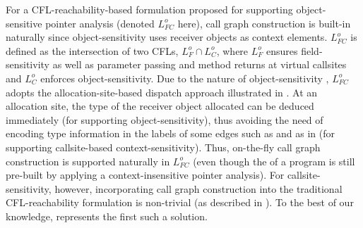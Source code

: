 For a CFL-reachability-based formulation \cite{lu2019precision, lu2021eagle}   proposed for
supporting object-sensitive pointer
analysis \cite{milanova2002parameterized,milanova2005parameterized} (denoted
$L_{FC}^o$ here),  call graph
construction is  built-in naturally since object-sensitivity uses receiver objects
as context elements. 
$L_{FC}^o$ is  defined as the intersection of two CFLs, 
$L_{F}^o \cap L_{C}^o$, where $L_{F}^o$ ensures field-sensitivity as well
as  parameter
passing and method returns at virtual callsites and $L_{C}^o$ enforces
object-sensitivity. Due to the nature of object-sensitivity
\cite{milanova2002parameterized,milanova2005parameterized},
$L_{FC}^{o}$ adopts the allocation-site-based dispatch approach illustrated in . At an allocation site, the type of the receiver object allocated can be deduced
immediately (for supporting object-sensitivity), thus avoiding the need of 
encoding type information in the labels of some \pag edges such as \new[\texttt{t}] and \indispatch[\texttt{t}] as in \LF (for supporting callsite-based
context-sensitivity). Thus,  on-the-fly call graph construction is supported naturally in $L_{FC}^o$ (even though the \pag of a program is still pre-built
by applying  a context-insensitive pointer
analysis). 
For
callsite-sensitivity, however, incorporating call graph construction into the
traditional CFL-reachability formulation \cite{sridharan2006refinement, yan2011demand, shang2012demand} is non-trivial (as described in ). To the best of our
knowledge, \LFCR represents the first such a solution.

